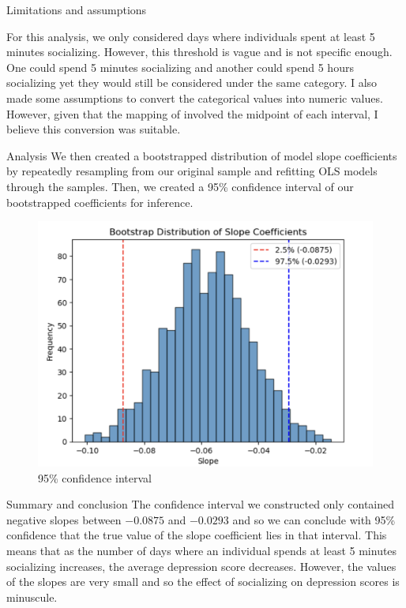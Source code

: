 \documentclass{beamer}
\begin{document}
\begin{frame}{Limitations and assumptions}

    For this analysis, we only considered days where individuals spent at least 5 minutes socializing. However, this threshold is vague and is not specific enough. One could spend 5 minutes socializing and another could spend 5 hours socializing yet they would still be considered under the same category. I also made some assumptions to convert the categorical values into numeric values. However, given that the mapping of involved the midpoint of each interval, I believe this conversion was suitable.
    
\end{frame}

\begin{frame}{Analysis}
    We then created a bootstrapped distribution of model slope coefficients by repeatedly resampling from our original sample and refitting OLS models through the samples. Then, we created a 95\% confidence interval of our bootstrapped coefficients for inference.
    \begin{figure}
        \centering
        \includegraphics[width=0.5\linewidth]{95CI.png}
        \caption{95\% confidence interval}
        \label{fig:enter-label}
    \end{figure}
\end{frame}

\begin{frame}{Summary and conclusion}
The confidence interval we constructed only contained negative slopes between $-0.0875$ and $-0.0293$ and so we can conclude with 95\% confidence that the true value of the slope coefficient lies in that interval. This means that as the number of days where an individual spends at least 5 minutes socializing increases, the average depression score decreases. However, the values of the slopes are very small and so the effect of socializing on depression scores is minuscule.
    
\end{frame}
\end{document}
